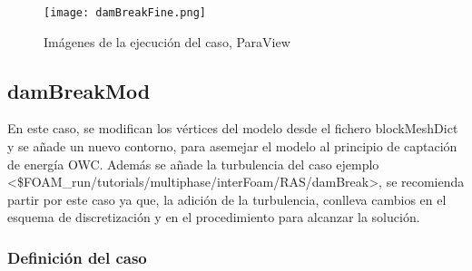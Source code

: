\begin{figure}
\centering
\texttt{[image: damBreakFine.png]}
\caption{Imágenes de la ejecución del caso, ParaView}
\label{fig:damBreakFine}
\end{figure}

\subsection{damBreakMod}\label{header-n750}

En este caso, se modifican los vértices del modelo desde el fichero
blockMeshDict y se añade un nuevo contorno, para asemejar el modelo al
principio de captación de energía OWC. Además se añade la turbulencia
del caso ejemplo
\textless{}\$FOAM\_run/tutorials/multiphase/interFoam/RAS/damBreak\textgreater{},
se recomienda partir por este caso ya que, la adición de la turbulencia,
conlleva cambios en el esquema de discretización y en el procedimiento
para alcanzar la solución.

\subsubsection{Definición del caso}\label{header-n755}

